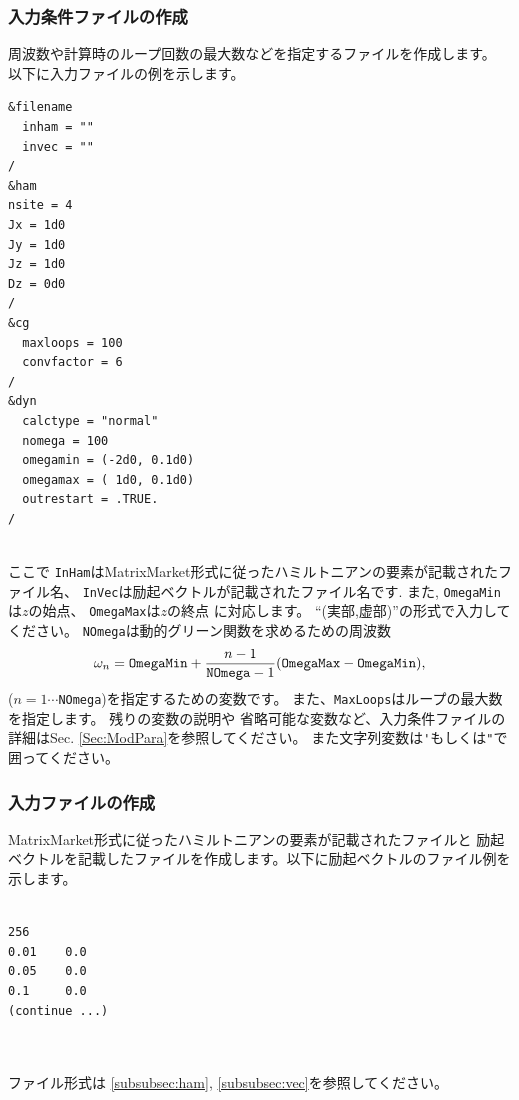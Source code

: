 \documentclass[12pt,titlepage]{jarticle}
\begin{document}
\subsubsection*{入力条件ファイルの作成}
周波数や計算時のループ回数の最大数などを指定するファイルを作成します。
以下に入力ファイルの例を示します。\\
\begin{minipage}{10cm}
\begin{screen}
\begin{verbatim}
&filename
  inham = ""
  invec = ""
/
&ham
nsite = 4
Jx = 1d0
Jy = 1d0
Jz = 1d0
Dz = 0d0
/
&cg
  maxloops = 100
  convfactor = 6
/
&dyn
  calctype = "normal"
  nomega = 100
  omegamin = (-2d0, 0.1d0)
  omegamax = ( 1d0, 0.1d0)
  outrestart = .TRUE.
/
\end{verbatim}
\end{screen}
\end{minipage}
\\
ここで
\verb|InHam|はMatrixMarket形式に従ったハミルトニアンの要素が記載されたファイル名、
\verb|InVec|は励起ベクトルが記載されたファイル名です.
また,
\verb|OmegaMin|は$z$の始点、
\verb|OmegaMax|は$z$の終点
に対応します。
``(実部,虚部)''の形式で入力してください。
\verb|NOmega|は動的グリーン関数を求めるための周波数
\begin{align}
  \omega_n =  {\tt OmegaMin} + \frac{n-1}{{\tt NOmega}-1}({\tt OmegaMax} - {\tt OmegaMin}),
\end{align}
($n=1\cdots$\verb|NOmega|)を指定するための変数です。
また、\verb|MaxLoops|はループの最大数を指定します。
残りの変数の説明や
省略可能な変数など、入力条件ファイルの詳細はSec. \ref{Sec:ModPara}を参照してください。
また文字列変数は\verb|'|もしくは\verb|"|で囲ってください。

\subsubsection*{入力ファイルの作成}
MatrixMarket形式に従ったハミルトニアンの要素が記載されたファイルと
励起ベクトルを記載したファイルを作成します。以下に励起ベクトルのファイル例を示します。\\
\\
\begin{minipage}{10cm}
\begin{screen}
\begin{verbatim}
256
0.01    0.0
0.05    0.0
0.1     0.0
(continue ...)
\end{verbatim}
\end{screen}
\end{minipage}
\\\\
ファイル形式は \ref{subsubsec:ham},  \ref{subsubsec:vec}を参照してください。\\
\end{document}
